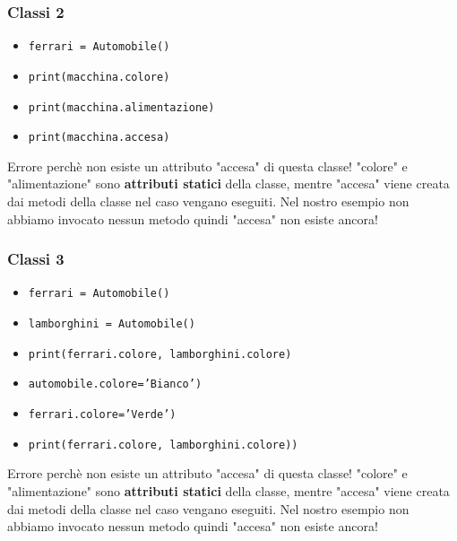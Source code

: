 \documentclass{beamer}
\begin{document}
\begin{frame}

    \frametitle{Classi 2}
        \begin{itemize}
        \item \texttt{ferrari = Automobile()}
        \item \texttt{print(macchina.colore)}
        \item \texttt{print(macchina.alimentazione)}
        \item \texttt{print(macchina.accesa)}
    \end{itemize}

    Errore perchè non esiste un attributo "accesa" di questa classe!
    "colore" e "alimentazione" sono \textbf{attributi statici} della classe, mentre "accesa" viene creata dai metodi della classe nel caso vengano eseguiti.
    Nel nostro esempio non abbiamo invocato nessun metodo quindi "accesa" non esiste ancora!
\end{frame}

\begin{frame}

    \frametitle{Classi 3}
        \begin{itemize}
        \item \texttt{ferrari = Automobile()}
        \item \texttt{lamborghini = Automobile()}
        \item \texttt{print(ferrari.colore, lamborghini.colore)}
        \item \texttt{automobile.colore='Bianco')}
        \item \texttt{ferrari.colore='Verde')}
        \item \texttt{print(ferrari.colore, lamborghini.colore))}
    \end{itemize}

    Errore perchè non esiste un attributo "accesa" di questa classe!
    "colore" e "alimentazione" sono \textbf{attributi statici} della classe, mentre "accesa" viene creata dai metodi della classe nel caso vengano eseguiti.
    Nel nostro esempio non abbiamo invocato nessun metodo quindi "accesa" non esiste ancora!
\end{frame}
\end{document}
